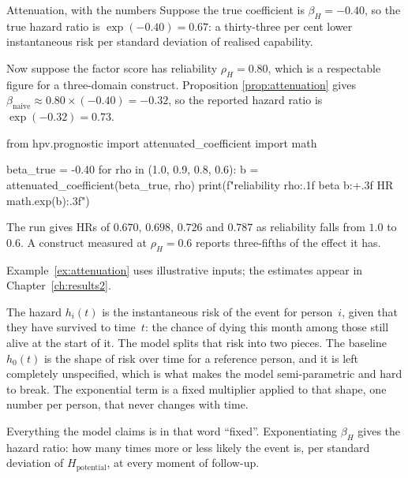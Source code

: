 \begin{workedexample}[attenuation]{Attenuation, with the numbers}
Suppose the true coefficient is $\beta_H=-0.40$, so the true hazard ratio is
$\exp(-0.40)=0.67$: a thirty-three per cent lower instantaneous risk per
standard deviation of realised capability.

Now suppose the factor score has reliability $\rho_H=0.80$, which is a
respectable figure for a three-domain construct. Proposition
\ref{prop:attenuation} gives
$\beta_{\mathrm{naive}}\approx0.80\times(-0.40)=-0.32$, so the reported hazard
ratio is $\exp(-0.32)=0.73$.

\begin{wecode}[Python]
from hpv.prognostic import attenuated_coefficient
import math

beta_true = -0.40
for rho in (1.0, 0.9, 0.8, 0.6):
    b = attenuated_coefficient(beta_true, rho)
    print(f"reliability {rho:.1f}  beta {b:+.3f}  HR {math.exp(b):.3f}")
\end{wecode}

\noindent The run gives HRs of $0.670$, $0.698$, $0.726$ and $0.787$ as
reliability falls from $1.0$ to $0.6$. A construct measured at $\rho_H=0.6$
reports three-fifths of the effect it has.

\end{workedexample}

Example~\ref{ex:attenuation} uses illustrative inputs; the estimates appear in Chapter~\ref{ch:results2}.

\begin{reading}
The hazard $h_i(t)$ is the instantaneous risk of the event for person~$i$,
given that they have survived to time~$t$: the chance of dying this month among
those still alive at the start of it. The model splits that risk into two
pieces. The baseline $h_0(t)$ is the shape of risk over time for a reference
person, and it is left completely unspecified, which is what makes the model
semi-parametric and hard to break. The exponential term is a fixed multiplier applied
to that shape, one number per person, that never changes with time.

Everything the model claims is in that word ``fixed''. Exponentiating
$\beta_H$ gives the hazard ratio: how many times more or less likely the event
is, per standard deviation of $H_{\text{potential}}$, at every moment of
follow-up.
\end{reading}

